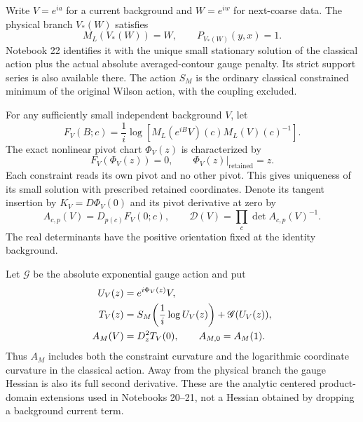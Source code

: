 \documentclass[11pt]{article}
\theoremstyle{remark}
\begin{document}
Write $V=e^{ia}$ for a current background and $W=e^{iw}$ for next-coarse
data. The physical branch $V_*(W)$ satisfies
\begin{equation}\label{gc-physical-branch}
 M_L(V_*(W))=W,\qquad P_{V_*(W)}(y,x)=1.
\end{equation}
Notebook 22 identifies it with the unique small stationary solution
of the classical action plus the actual absolute averaged-contour
gauge penalty. Its strict support series is also available there.
The action $S_M$ is the ordinary classical constrained minimum of
the original Wilson action, with the coupling excluded.

For any sufficiently small independent background $V$, let
\begin{equation}\label{gc-constraint}
 F_V(B;c)=\frac1i\log\!\left[
 M_L(e^{iB}V)(c)M_L(V)(c)^{-1}\right].
\end{equation}
The exact nonlinear pivot chart $\Phi_V(z)$ is characterized by
\begin{equation}\label{gc-chart}
 F_V(\Phi_V(z))=0,\qquad
 \Phi_V(z)|_{\mathrm{retained}}=z.
\end{equation}
Each constraint reads its own pivot and no other pivot. This gives
uniqueness of its small solution with prescribed retained coordinates.
Denote its tangent insertion by $K_V=D\Phi_V(0)$ and its pivot
derivative at zero by
\begin{equation}\label{gc-pivot}
 A_{c,p}(V)=D_{p(c)}F_V(0;c),\qquad
 \mathcal D(V)=\prod_c\det A_{c,p}(V)^{-1}.
\end{equation}
The real determinants have the positive orientation fixed at the
identity background.

Let $\mathscr G$ be the absolute exponential gauge action and put
\begin{align}
 U_V(z)&=e^{i\Phi_V(z)}V, \notag\\
 T_V(z)&=S_M\!\left(\frac1i\log U_V(z)\right)
                         +\mathscr G(U_V(z)),             \label{gc-total-action}\\
 A_M(V)&=D_z^2T_V(0),\qquad A_{M,0}=A_M(1).              \label{gc-precision}
\end{align}
Thus $A_M$ includes both the constraint curvature and the logarithmic
coordinate curvature in the classical action. Away from the physical
branch the gauge Hessian is also its full second derivative. These
are the analytic centered product-domain extensions used in
Notebooks 20--21, not a Hessian obtained by dropping a background
current term.
\end{document}
